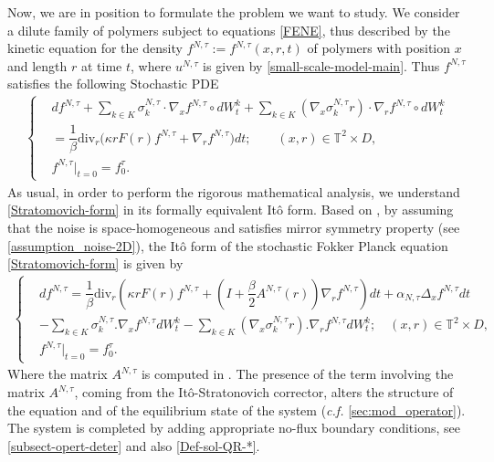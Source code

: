 \documentclass[a4paper,12pt, reqno]{amsart}
\renewcommand{\k}{\kappa}
\newcommand{\Div}{\text{div}}
\begin{document}
Now, we are in position to formulate the problem we want to study. 
We consider a dilute  family of polymers subject to equations
\eqref{FENE}, thus described by the kinetic equation for the density $f^{N,\tau}:=f^{N,\tau}\left(
x,r,t\right)  $ of polymers with position $x$ and length $r$ at time $t$, where $u^{N, \tau}$ is given by \eqref{small-scale-model-main}.
 Thus  $f^{N,\tau}$ satisfies the following Stochastic PDE
\begin{align}\label{Stratomovich-form}
	\begin{cases}&d f^{N,\tau}+\sum_{k\in K}%
\sigma_{k}^{N,\tau}\cdot \nabla_xf^{N,\tau} \circ dW_{t}^{k}+ \sum_{k\in K}%
(\nabla_x\sigma_{k}^{N,\tau}r)\cdot\nabla_rf^{N,\tau}\circ dW_{t}^{k}\\&=	\dfrac{1}{\beta}\Div_r \big(\k rF(r)f^{N,\tau}+ \nabla_rf^{N,\tau}\big) dt; \qquad (x,r)\in \mathbb{T}^2\times D,\\	
 	&f^{N,\tau}|_{t=0}=f_0^\tau.
			\end{cases}\end{align}
      As usual, in order to perform the rigorous mathematical analysis, we understand \eqref{Stratomovich-form} in its formally equivalent It\^o form. Based on \cite[Lemma 2 and 3]{Flandoli-Tahraoui}, by assuming that the noise is space-homogeneous and satisfies mirror
symmetry property (see \autoref{assumption_noise-2D}), the It\^{o} form of the stochastic Fokker Planck equation \eqref{Stratomovich-form} is given by
	\begin{align}\label{Ito-FP}
		\begin{cases}&df^{N,\tau}=	\dfrac{1}{\beta}\Div_r \left(\k r F(r)f^{N,\tau}+	\left(I +\dfrac{\beta}{2}  A^{N,\tau}(r) \right)\nabla_rf^{N,\tau}\right)dt +\alpha_{N,\tau}\Delta_x f^{N,\tau}dt\\[0.15cm]
            &-\sum_{k\in K}\sigma_k^{N,\tau}.\nabla_xf^{N,\tau}dW^k_t -\sum_{k\in K}(\nabla_x \sigma_k^{N,\tau}r).\nabla_rf^{N,\tau} dW^k_t  ;\quad (x,r)\in \mathbb{T}^2\times D,\\[0.15cm]
			&f^{N,\tau}|_{t=0}=f_0^\tau.
	\end{cases}\end{align}
    Where the matrix $A^{N,\tau}$ is computed in . The presence of the term involving the matrix $A^{N, \tau}$, coming from the It\^{o}-Stratonovich corrector, alters the structure of the equation and of the equilibrium state of the system (\textit{c.f.} \autoref{sec:mod_operator}). 
The system is completed by adding appropriate no-flux boundary conditions, see 
\autoref{subsect-opert-deter} and  also \autoref{Def-sol-QR-*}.\\
\end{document}
